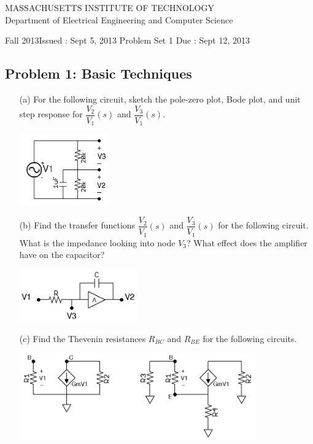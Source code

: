 \documentclass[11pt,twoside]{article}
\newlength{\toppush}
\newcommand{\htitle}[3]{\begin{center}
\vspace*{-\toppush}
{\large MASSACHUSETTS INSTITUTE OF TECHNOLOGY}\\
{\small Department of Electrical Engineering and Computer Science}\\
\vspace*{1ex}{\Large #2}\end{center}
\noindent
\newline\parbox{6.5in}
{Fall 2013\hfill Issued : #1 \newline
 Problem Set 1 \hfill Due : #3\newline
}}
\newcommand{\handout}[3]{\thispagestyle{empty}
\pagestyle{myheadings}\htitle{#1}{#2}{#3}}
\begin{document}
\handout{Sept 5, 2013}{6.301 Solid State Circuits}{Sept 12, 2013}
\setlength{\parindent}{0pt}

\newcommand{\solution}{
 \medskip
 {\bf Solution:}
}

\hrulefill

\flushleft

\subsection*{Problem 1: Basic Techniques}
\begin{enumerate}
	\item[(a)] For the following circuit, sketch the pole-zero plot, Bode plot, 
			  and unit step response for $\dfrac{V_2}{V_1}(s)$ and $\dfrac{V_3}{V_1}(s)$.  
\begin{center}
\includegraphics[width=0.3\textwidth]{tf.png}
\end{center}
	\item[(b)] Find the transfer functions $\dfrac{V_2}{V_1}(s)$ and $\dfrac{V_3}{V_1}(s)$ for the following circuit.\\
	  What is the impedance looking into node $V_3$?  What effect does the amplifier have on the capacitor? 

\begin{center}
\includegraphics[width=0.4\textwidth]{miller.png}
\end{center}


	\item[(c)] Find the Thevenin resistances $R_{BC}$ and $R_{BE}$ for the following circuits. 

\begin{center}
\includegraphics[width=0.8\textwidth]{thevenin.png}
\end{center}


\end{enumerate}
\clearpage
\end{document}
